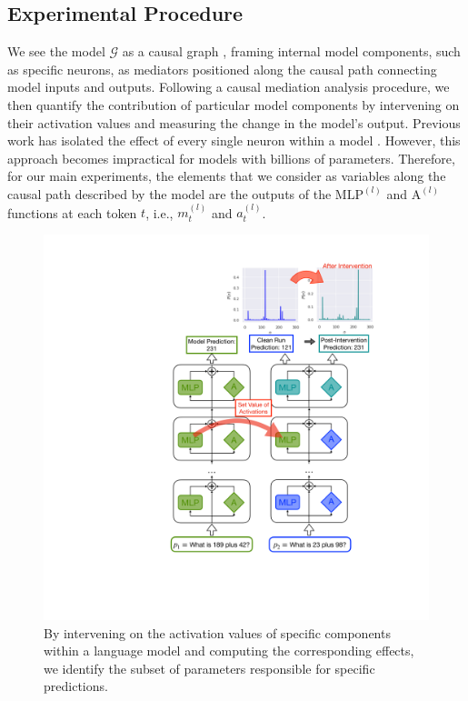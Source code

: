 \documentclass[11pt]{article}
\newcommand{\atl}[2]{#1^{(#2)}}
\begin{document}
\subsection{Experimental Procedure}
We see the model $\mathcal{G}$ as a causal graph \cite{pearl2009causality}, framing internal model components, such as specific neurons, as mediators positioned along the causal path connecting model inputs and outputs. Following a causal mediation analysis procedure, we then quantify the contribution of particular model components by intervening on their activation values and measuring the change in the model's output.
Previous work has isolated the effect of every single neuron within a model \cite{vig2020investigating, finlayson-etal-2021-causal}. However, this approach becomes impractical for models with billions of parameters. Therefore, for our main experiments, the elements that we consider as variables along the causal path described by the model are the outputs of the $\atl{\mathrm{MLP}}{l}$ and $\atl{\mathrm{A}}{l}$ functions at each token $t$, i.e., $\atl{m}{l}_t$ and $\atl{a}{l}_t$.



\begin{figure}[t]
    \centering
    \includegraphics[width=0.96\columnwidth]{img/main_fig.pdf}
    \caption{By intervening on the activation values of specific components within a language model and computing the corresponding effects, we identify the subset of parameters responsible for specific predictions.}
    \label{fig:main_fig}
    \vspace{-0.5mm}
\end{figure}
\end{document}
